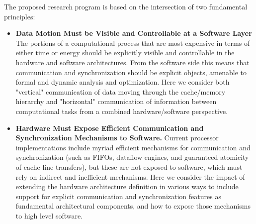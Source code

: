 The proposed research program is based on the intersection of two
fundamental principles:
\begin{itemize}
\item \textbf{Data Motion Must be Visible and Controllable at a Software Layer}  The
  portions of a computational process that are most expensive in terms
  of either time or energy should be explicitly visible and
  controllable in the hardware and software architectures. From the software
  side this means that communication and synchronization should be explicit
  objects, amenable to formal and dynamic analysis and optimization.
  Here we
  consider both "vertical" communication of data moving through the
  cache/memory hierarchy and "horizontal" communication of information
  between computational tasks from a combined hardware/software
  perspective.
\item \textbf{Hardware Must Expose Efficient Communication and
  Synchronization Mechanisms to Software.}  Current processor
  implementations include myriad efficient mechanisms for
  communication and synchronization (such as FIFOs, dataflow engines,
  and guaranteed atomicity of cache-line transfers), but these are not
  exposed to software, which must rely on indirect and inefficient
  mechanisms.  Here we consider the impact of extending the hardware
  architecture definition in various ways to include support for
  explicit communication and synchronization features as fundamental
  architectural components, and how to expose those mechanisms to high
  level software.
\end{itemize}


\endinput
\subsection*{Topic 1: Data Motion Must Be Visible and Controllable}

Current hardware technologies go to great lengths to make data motion
through the memory hierarchy both invisible and uncontrollable,
requiring increasingly large expenditures of design time, silicon
area, and power consumption to maintain the model of transparent
caches. 

At the same time, such motion is also not addressed explicitly
in software: data motion and affinity have no status in OpenMP, and
communication `just happens' in MPI, but does not correspond to any
language objects.
     
\begin{comment}
  Continued performance gains in parallel computing require that design
  time, silicon area, and energy use be substantially reduced.  While it
  would be convenient from a programming perspective to eliminate the
  memory hierarchy entirely (as proposed, for example, in the Tera MTA
  programming model~\cite{Tera1990}), the memory hierarchy is based on
  fundamental physics, and for the foreseeable future we will have to
  exploit hierarchical memories in order to bound power consumption.
\end{comment}

